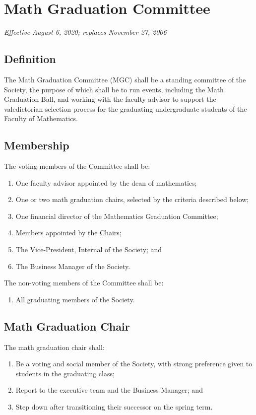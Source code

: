 \section{Math Graduation Committee}
\emph{Effective August 6, 2020; replaces November 27, 2006}\\

\subsection{Definition}
The Math Graduation Committee (MGC) shall be a standing committee of the Society, the 
purpose of which shall be to run events, including the Math Graduation Ball, and
working with the faculty advisor to support the valedictorian selection process for
the graduating undergraduate students of the Faculty of Mathematics.

\subsection{Membership}
The voting members of the Committee shall be:
\begin{enumerate}
\item One faculty advisor appointed by the dean of mathematics;
\item One or two math graduation chairs, selected by the criteria described below;
\item One financial director of the Mathematics Graduation Committee;
\item Members appointed by the Chairs;
\item The Vice-President, Internal of the Society; and 
\item The Business Manager of the Society.
\end{enumerate}
The non-voting members of the Committee shall be:
\begin{enumerate}
\item All graduating members of the Society.
\end{enumerate}

\subsection{Math Graduation Chair}
The math graduation chair shall:
\begin{enumerate}
\item Be a voting and social member of the Society, with strong preference given to students in the graduating class;
\item Report to the executive team and the Business Manager; and 
\item Step down after transitioning their successor on the spring term.
\end{enumerate}

